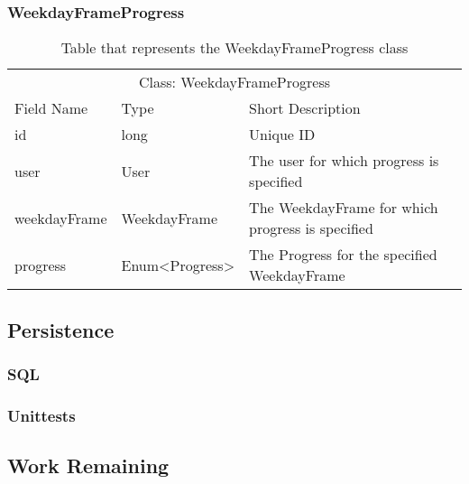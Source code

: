 \noindent
\begin{description}
    \item
    \item
    \item
    \item
\end{description}

\subsubsection{WeekdayFrameProgress}


\begin{table}[]
\centering
\caption{Table that represents the WeekdayFrameProgress class}
\label{tbl:WeekdayFrameProgress}
\begin{tabular}{lll}
\multicolumn{3}{c}{Class: WeekdayFrameProgress}                                                      \\
Field Name   & Type                               & Short Description                                \\
id           & long                               & Unique ID                                        \\
user         & User                               & The user for which progress is specified         \\
weekdayFrame & WeekdayFrame                       & The WeekdayFrame for which progress is specified \\
progress     & Enum\textless Progress\textgreater & The Progress for the specified WeekdayFrame     
\end{tabular}
\end{table}

\noindent
\begin{description}
    \item
    \item
    \item
\end{description}


\subsection{Persistence}
\subsubsection{SQL}
\subsubsection{Unittests}



\subsection{Work Remaining} %

